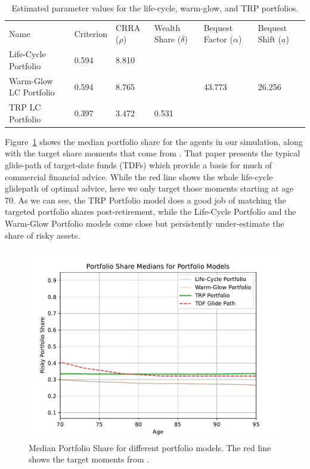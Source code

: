 \documentclass{article}
\newcommand{\CRRA}{\rho}
\begin{document}
\begin{table}
\centering
\caption[]{Estimated parameter values for the life-cycle, warm-glow, and TRP portfolios.}
\label{parameters}
\begin{tabular}{p{}p{}p{}p{}p{}p{}}
\toprule
Name & Criterion & CRRA ($\CRRA$) & Wealth Share ($\delta$) & Bequest Factor ($\alpha$) & Bequest Shift ($\underline{a}$) \\
Life-Cycle Portfolio & 0.594 & 8.810 &  &  &  \\
Warm-Glow LC Portfolio & 0.594 & 8.765 &  & 43.773 & 26.256 \\
TRP LC Portfolio & 0.397 & 3.472 & 0.531 &  &  \\
\bottomrule
\end{tabular}
\end{table}

Figure~\ref{medshare} shows the median portfolio share for the agents in our simulation, along with the target share moments that come from \cite{Aboagye2024}.
That paper presents the typical glide-path of target-date funds (TDFs) which provide a basis for much of commercial financial advice.
While the red line shows the whole life-cycle glidepath of optimal advice, here we only target those moments starting at age 70.
As we can see, the TRP Portfolio model does a good job of matching the targeted portfolio shares post-retirement, while the Life-Cycle Portfolio and the Warm-Glow Portfolio models come close but persistently under-estimate the share of risky assets.

\begin{figure}[!htbp]
\centering
\includegraphics[width=0.7\linewidth]{files/median_share-97dc90085c43f29226e26f2e405305d8.pdf}
\caption[]{Median Portfolio Share for different portfolio models. The red line shows the target moments from \cite{Aboagye2024}.}
\label{medshare}
\end{figure}
\end{document}
